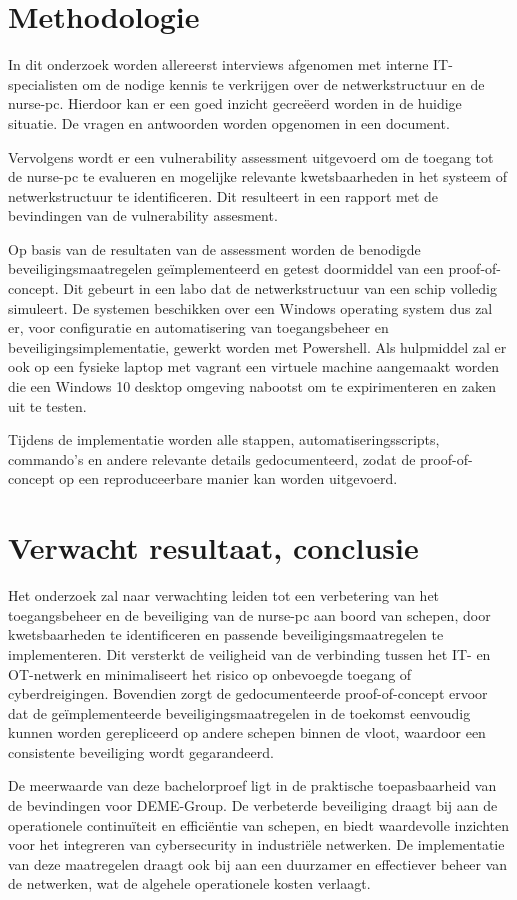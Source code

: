 \section{Methodologie}%
\label{sec:methodologie}
In dit onderzoek worden allereerst interviews afgenomen met interne IT-specialisten om de nodige kennis te verkrijgen over de netwerkstructuur en de nurse-pc. 
Hierdoor kan er een goed inzicht gecreëerd worden in de huidige situatie. De vragen en antwoorden worden opgenomen in een document.

Vervolgens wordt er een vulnerability assessment uitgevoerd om de toegang tot de nurse-pc te evalueren en mogelijke relevante kwetsbaarheden in het systeem 
of netwerkstructuur te identificeren. Dit resulteert in een rapport met de bevindingen van de vulnerability assesment.

Op basis van de resultaten van de assessment worden de benodigde beveiligingsmaatregelen geïmplementeerd en getest doormiddel van een proof-of-concept. 
Dit gebeurt in een labo dat de netwerkstructuur van een schip volledig simuleert. De systemen beschikken over een Windows operating system dus zal er, voor configuratie en automatisering van toegangsbeheer en beveiligingsimplementatie, gewerkt worden met Powershell. 
Als hulpmiddel zal er ook op een fysieke laptop met vagrant een virtuele machine aangemaakt worden die een Windows 10 desktop omgeving nabootst om te expirimenteren en zaken uit te testen.

Tijdens de implementatie worden alle stappen, automatiseringsscripts, commando's en andere relevante details gedocumenteerd, 
zodat de proof-of-concept op een reproduceerbare manier kan worden uitgevoerd.


\section{Verwacht resultaat, conclusie}%
\label{sec:verwachte_resultaten}
Het onderzoek zal naar verwachting leiden tot een verbetering van het toegangsbeheer en de beveiliging van de nurse-pc aan boord van schepen,
door kwetsbaarheden te identificeren en passende beveiligingsmaatregelen te implementeren. Dit versterkt de veiligheid
van de verbinding tussen het IT- en OT-netwerk en minimaliseert het risico op onbevoegde toegang of cyberdreigingen. 
Bovendien zorgt de gedocumenteerde proof-of-concept ervoor dat de geïmplementeerde beveiligingsmaatregelen in de toekomst eenvoudig kunnen 
worden gerepliceerd op andere schepen binnen de vloot, waardoor een consistente beveiliging wordt gegarandeerd.

De meerwaarde van deze bachelorproef ligt in de praktische toepasbaarheid van de bevindingen voor DEME-Group.
De verbeterde beveiliging draagt bij aan de operationele continuïteit en efficiëntie 
van schepen, en biedt waardevolle inzichten voor het integreren van cybersecurity in industriële netwerken. De implementatie 
van deze maatregelen draagt ook bij aan een duurzamer en effectiever beheer van de netwerken, wat de algehele operationele kosten 
verlaagt.


